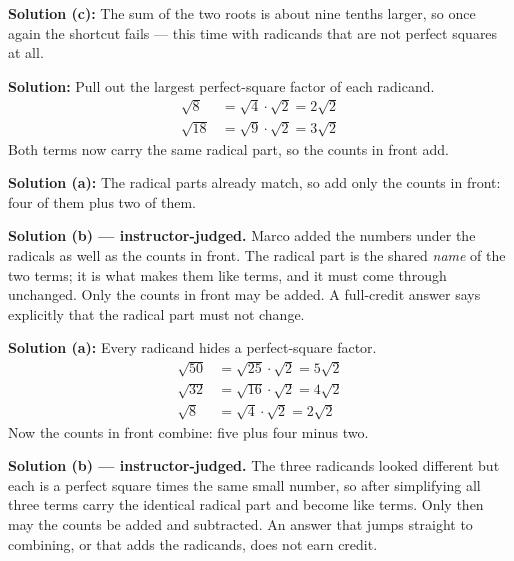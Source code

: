 \documentclass[12pt]{article}
\begin{document}
\textbf{Solution (c):} \quad The sum of the two roots is about nine tenths larger, so once
again the shortcut fails --- this time with radicands that are not perfect squares at all.
\ans{>}


\textbf{Solution:} \quad Pull out the largest perfect-square factor of each radicand.
\begin{align*}
  \sqrt{8} &= \sqrt{4}\cdot\sqrt{2} = 2\sqrt{2} \\
  \sqrt{18} &= \sqrt{9}\cdot\sqrt{2} = 3\sqrt{2}
\end{align*}
Both terms now carry the same radical part, so the counts in front add. 


\textbf{Solution (a):} \quad The radical parts already match, so add only the counts in
front: four of them plus two of them. 

\textbf{Solution (b) --- instructor-judged.} \quad Marco added the numbers under the
radicals as well as the counts in front. The radical part is the shared \emph{name} of the
two terms; it is what makes them like terms, and it must come through unchanged. Only the
counts in front may be added. A full-credit answer says explicitly that the radical part
must not change.


\textbf{Solution (a):} \quad Every radicand hides a perfect-square factor.
\begin{align*}
  \sqrt{50} &= \sqrt{25}\cdot\sqrt{2} = 5\sqrt{2} \\
  \sqrt{32} &= \sqrt{16}\cdot\sqrt{2} = 4\sqrt{2} \\
  \sqrt{8} &= \sqrt{4}\cdot\sqrt{2} = 2\sqrt{2}
\end{align*}
Now the counts in front combine: five plus four minus two. 

\textbf{Solution (b) --- instructor-judged.} \quad The three radicands looked different but
each is a perfect square times the same small number, so after simplifying all three terms
carry the identical radical part and become like terms. Only then may the counts be added
and subtracted. An answer that jumps straight to combining, or that adds the radicands,
does not earn credit.
\end{document}
